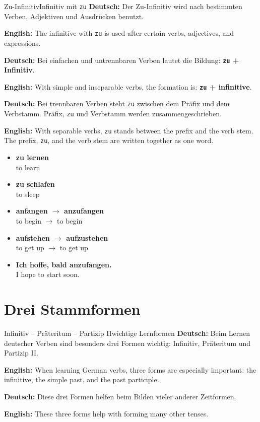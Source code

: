 \documentclass[a4paper,11pt]{article}
\newcommand{\GermanText}[1]{\textbf{Deutsch: }#1\par}
\newcommand{\EnglishText}[1]{{\small\color{SoftGray}\textbf{English: }#1\par}}
\newcommand{\ExampleItem}[2]{\item \textbf{#1}\\{\small\color{SoftGray}#2}}
\begin{document}
        \begin{grammarentry}{Zu-Infinitiv}{Infinitiv mit \texttt{zu}}
            \GermanText{Der Zu-Infinitiv wird nach bestimmten Verben, Adjektiven und Ausdrücken benutzt.}
            \EnglishText{The infinitive with \texttt{zu} is used after certain verbs, adjectives, and expressions.}

            \GermanText{Bei einfachen und untrennbaren Verben lautet die Bildung: \textbf{\texttt{zu} + Infinitiv}.}
            \EnglishText{With simple and inseparable verbs, the formation is: \textbf{\texttt{zu} + infinitive}.}

            \GermanText{Bei trennbaren Verben steht \texttt{zu} zwischen dem Präfix und dem Verbstamm. Präfix, \texttt{zu} und Verbstamm werden zusammengeschrieben.}
            \EnglishText{With separable verbs, \texttt{zu} stands between the prefix and the verb stem. The prefix, \texttt{zu}, and the verb stem are written together as one word.}
        \end{grammarentry}

        \begin{exbox}
            \begin{itemize}
                \ExampleItem{zu lernen}{to learn}
                \ExampleItem{zu schlafen}{to sleep}
                \ExampleItem{anfangen $\rightarrow$ anzufangen}{to begin $\rightarrow$ to begin}
                \ExampleItem{aufstehen $\rightarrow$ aufzustehen}{to get up $\rightarrow$ to get up}
                \ExampleItem{Ich hoffe, bald anzufangen.}{I hope to start soon.}
            \end{itemize}
        \end{exbox}

    \section{Drei Stammformen}

        \begin{grammarentry}{Infinitiv -- Präteritum -- Partizip II}{wichtige Lernformen}
            \GermanText{Beim Lernen deutscher Verben sind besonders drei Formen wichtig: Infinitiv, Präteritum und Partizip II.}
            \EnglishText{When learning German verbs, three forms are especially important: the infinitive, the simple past, and the past participle.}

            \GermanText{Diese drei Formen helfen beim Bilden vieler anderer Zeitformen.}
            \EnglishText{These three forms help with forming many other tenses.}
        \end{grammarentry}
\end{document}
